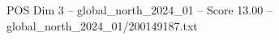 \begin{textsample}{POS Dim 3 – global\_north\_2024\_01 – Score 13.00 – global\_north\_2024\_01/200149187.txt}
\end{textsample}

